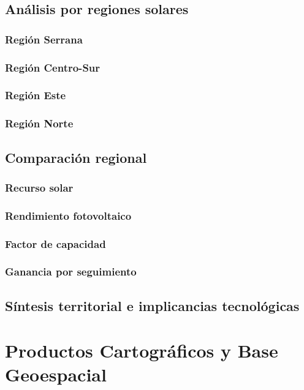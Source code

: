 \documentclass[11pt,a4paper]{article}
\begin{document}
\subsection{Análisis por regiones solares}

\subsubsection{Región Serrana}
\subsubsection{Región Centro-Sur}
\subsubsection{Región Este}
\subsubsection{Región Norte}

\subsection{Comparación regional}
\subsubsection{Recurso solar}
\subsubsection{Rendimiento fotovoltaico}
\subsubsection{Factor de capacidad}
\subsubsection{Ganancia por seguimiento}

\subsection{Síntesis territorial e implicancias tecnológicas}



\section{Productos Cartográficos y Base Geoespacial}
\end{document}

